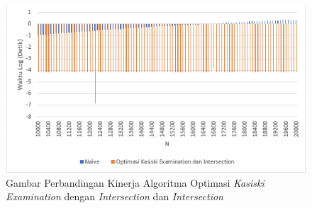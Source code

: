 	\begin{figure}[H]
	\centering
  	\includegraphics[scale=0.7]{images/bab5/ACD.png}
  	\caption{Gambar Perbandingan Kinerja Algoritma Optimasi \textit{Kasiski Examination} dengan \textit{Intersection} dan \textit{Intersection}}
  	\label{fig:banding12}
	\end{figure}
	
	
